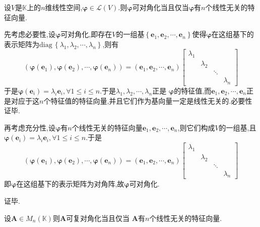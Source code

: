 \begin{formal}
\begin{theorem}[几何意义的可对角化条件]\label{thm:几何意义的可对角化条件}
    设$V$是$\mathbb{K}$上的$n$维线性空间,$\bm{\varphi}\in\mathcal{L}\left(V\right)$.则$\bm{\varphi}$可对角化当且仅当$\bm{\varphi}$有$n$个线性无关的特征向量.
\end{theorem}
\begin{Proof}
先考虑必要性,设$\bm{\varphi}$可对角化,即存在$V$的一组基$\left\{
    \bm{e}_1,\bm{e}_2,\cdots,\bm{e}_n
\right\}$使得$\bm{\varphi}$在这组基下的表示矩阵为$\mathrm{diag}\,\left\{
    \lambda_1,\lambda_2,\cdots,\lambda_n
\right\}$,则有
\[
\left(
    \bm{\varphi}\left(\bm{e}_1\right),
    \bm{\varphi}\left(\bm{e}_2\right),
    \cdots,
    \bm{\varphi}\left(\bm{e}_n\right)
\right)=
\left(
    \bm{e}_1, \bm{e}_2,\cdots,\bm{e}_n
\right)\begin{bmatrix}
    \lambda_1&&&\\
    &\lambda_2&&\\
    &&\ddots&\\
    &&&\lambda_n
\end{bmatrix}
\]于是$\bm{\varphi}\left(\bm{e}_i\right)=\lambda_i\bm{e}_i,\forall 1\leqslant i\leqslant n.$于是$\lambda_1,\lambda_2,\cdots,\lambda_n$正是
$\bm{\varphi}$的特征值,而$\bm{e}_1,\bm{e}_2,\cdots,\bm{e}_n$正是对应于这$n$个特征值的特征向量,并且它们作为基向量一定是线性无关的.必要性证毕.

再考虑充分性,设$\bm{\varphi}$有$n$个线性无关的特征向量$\bm{e}_1,\bm{e}_2,\cdots,\bm{e}_n$,则它们构成$V$的一组基,且$\bm{\varphi}\left(\bm{e}_i\right)=\lambda_i\bm{e}_i,\forall 1\leqslant i\leqslant n$.于是
\[
\left(
    \bm{\varphi}\left(\bm{e}_1\right),
    \bm{\varphi}\left(\bm{e}_2\right),
    \cdots,
    \bm{\varphi}\left(\bm{e}_n\right)
\right)=
\left(
    \bm{e}_1, \bm{e}_2,\cdots,\bm{e}_n
\right)\begin{bmatrix}
    \lambda_1&&&\\
    &\lambda_2&&\\
    &&\ddots&\\
    &&&\lambda_n
\end{bmatrix}
\]
即$\bm{\varphi}$在这组基下的表示矩阵为对角阵,故$\bm{\varphi}$可对角化.

证毕.\qedhere
\end{Proof}
\end{formal}
\begin{formal}
\begin{theorem}[代数意义的可对角化条件]\label{thm:代数意义的可对角化条件}
    设$\bm{A}\in M_n\left(
        \mathbb{K}
    \right)$则$\bm{A}$可复对角化当且仅当
    $\bm{A}$有$n$个线性无关的特征向量.
\end{theorem}
\end{formal}
